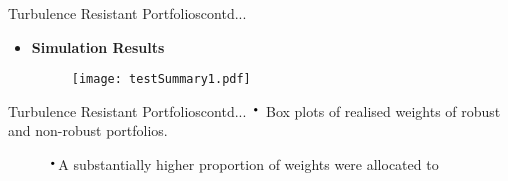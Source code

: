 \documentclass{beamer}
\newcommand*{\LargerCdot}{\raisebox{-0.25ex}{\scalebox{2.3}{$\cdot$}}}
\begin{document}
\begin{frame}{Turbulence Resistant Portfolios}{contd...}
	\begin{itemize}
	\vspace*{-0.1in}
		\item{\textbf{Simulation Results}}
		\begin{figure}
			\vspace*{-0.6 in}
			\scalebox{0.7}
			{\hspace*{-1.2 in}\texttt{[image: testSummary1.pdf]} }
		\end{figure}
		\end{itemize}
\end{frame}

\begin{frame}{Turbulence Resistant Portfolios}{contd...}
$\LargerCdot$ Box plots of realised weights of robust and non-robust portfolios.
\vspace*{-0.4 in}
	\begin{figure}
		\begin{itemize}
			\begin{center}
				\vspace*{0in}
				\hspace*{-0.75in}
			\end{center}
		\hspace*{-0.5in}
		$\LargerCdot$A substantially higher proportion of weights were allocated to \\
		\end{itemize}
	\end{figure}
\end{frame}
\end{document}
